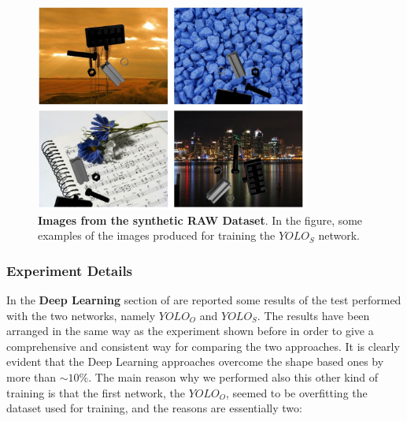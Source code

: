 \begin{figure}
    \centering
    \includegraphics[width=0.8\textwidth]{figures/4_experiments/synthetic_dataset_ex}
    \caption{\textbf{Images from the synthetic RAW Dataset}. In the figure, some examples of the images produced for training the $YOLO_S$ network.}
    \label{fig:synthetic_dataset_ex}
\end{figure}
\subsubsection{Experiment Details}
In the \textbf{Deep Learning} section of  are reported some results of the test performed with the two networks, namely $YOLO_O$ and $YOLO_S$. The results have been arranged in the same way as the experiment shown before in order to give a comprehensive and consistent way for comparing the two approaches. It is clearly evident that the Deep Learning approaches overcome the shape based ones by more than $\sim10\%$. The main reason why we performed also this other kind of training is that the first network, the $YOLO_O$, seemed to be overfitting the dataset used for training, and the reasons are essentially two:

